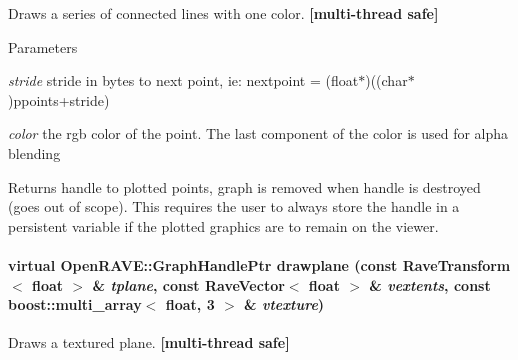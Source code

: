 Draws a series of connected lines with one color. {\bfseries \mbox{[}multi-\/thread safe\mbox{]}} 


\begin{DoxyParams}{Parameters}
\item[{\em stride}]stride in bytes to next point, ie: nextpoint = (float$\ast$)((char$\ast$)ppoints+stride) \item[{\em color}]the rgb color of the point. The last component of the color is used for alpha blending \end{DoxyParams}
\begin{DoxyReturn}{Returns}
handle to plotted points, graph is removed when handle is destroyed (goes out of scope). This requires the user to always store the handle in a persistent variable if the plotted graphics are to remain on the viewer. 
\end{DoxyReturn}
\hypertarget{classOpenRAVE_1_1EnvironmentBase_a11affcfff03b7440e0fbff2b1199a3e3}{
\paragraph[{drawplane}]{\setlength{\rightskip}{0pt plus 5cm}virtual OpenRAVE::GraphHandlePtr drawplane (const RaveTransform$<$ float $>$ \& {\em tplane}, \/  const RaveVector$<$ float $>$ \& {\em vextents}, \/  const boost::multi\_\-array$<$ float, 3 $>$ \& {\em vtexture})}\hfill}
\label{classOpenRAVE_1_1EnvironmentBase_a11affcfff03b7440e0fbff2b1199a3e3}


Draws a textured plane. {\bfseries \mbox{[}multi-\/thread safe\mbox{]}} 


